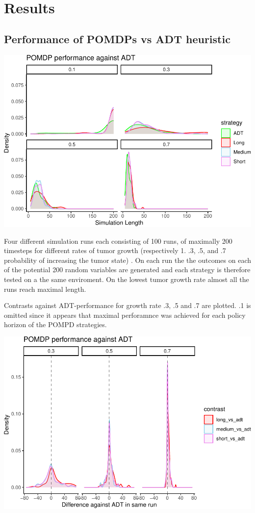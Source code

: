 \documentclass[notspecified,article,submit,moreauthors,pdftex]{Definitions/mdpi}
\begin{document}
\section{Results}\label{results}

\subsection{Performance of POMDPs vs ADT
heuristic}\label{performance-of-pomdps-vs-adt-heuristic}

\includegraphics{SocultPaper_files/figure-latex/unnamed-chunk-1-1.pdf}

Four different simulation runs each consisting of 100 runs, of maximally
200 timesteps for different rates of tumor growth (respectively 1. .3,
.5, and .7 probability of increasing the tumor state) . On each run the
the outcomes on each of the potential 200 random variables are generated
and each strategy is therefore tested on a the same enviroment. On the
lowest tumor growth rate almost all the runs reach maximal length.

Contrasts against ADT-performance for growth rate .3, .5 and .7 are
plotted. .1 is omitted since it appears that maximal perforamnce was
achieved for each policy horizon of the POMPD strategies.

\includegraphics{SocultPaper_files/figure-latex/unnamed-chunk-2-1.pdf}
\end{document}
